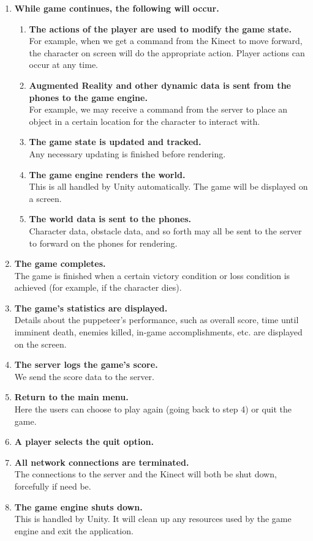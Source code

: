 \documentclass[10pt,letterpaper,oneside,english]{report}
\begin{document}
\begin{enumerate}
		\item \textbf{While game continues, the following will occur.}
		\begin{enumerate}
			\item \textbf{The actions of the player are used to modify the game state.} \\ For example, when we get a command from the Kinect to move forward, the character on screen will do the appropriate action. Player actions can occur at any time.
			\item \textbf{Augmented Reality and other dynamic data is sent from the phones to the game engine.} \\ For example, we may receive a command from the server to place an object in a certain location for the character to interact with.
			\item \textbf{The game state is updated and tracked.} \\ Any necessary updating is finished before rendering.
			\item \textbf{The game engine renders the world.} \\ This is all handled by Unity automatically. The game will be displayed on a screen.
			\item \textbf{The world data is sent to the phones.} \\ Character data, obstacle data, and so forth may all be sent to the server to forward on the phones for rendering.
		\end{enumerate}
		\item \textbf{The game completes.} \\ The game is finished when a certain victory condition or loss condition is achieved (for example, if the character dies).
		\item \textbf{The game’s statistics are displayed.} \\ Details about the puppeteer’s performance, such as overall score, time until imminent death, enemies killed, in-game accomplishments, etc. are displayed on the screen.
		\item \textbf{The server logs the game’s score.} \\ We send the score data to the server.
		\item \textbf{Return to the main menu.} \\ Here the users can choose to play again (going back to step 4) or quit the game.
		\item \textbf{A player selects the quit option.}
		\item \textbf{All network connections are terminated.} \\ The connections to the server and the Kinect will both be shut down, forcefully if need be.
		\item \textbf{The game engine shuts down.} \\ This is handled by Unity. It will clean up any resources used by the game engine and exit the application.
	\end{enumerate}
\end{document}
